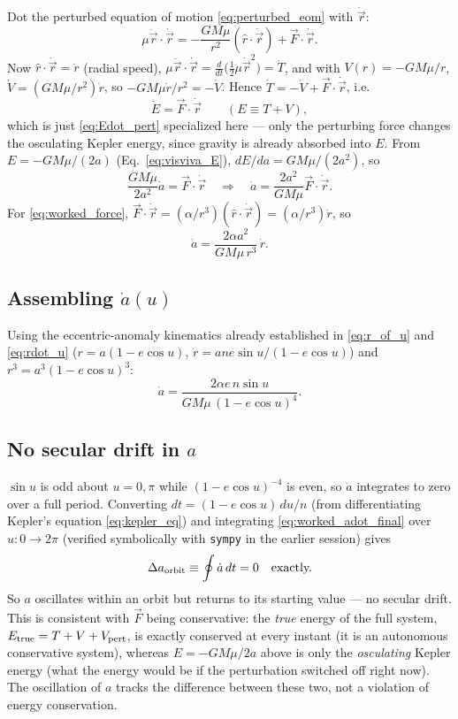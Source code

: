 \documentclass[11pt]{article}
\newcommand{\vecr}{\vec r}
\newcommand{\vecF}{\vec F}
\newcommand{\rhat}{\hat r}
\begin{document}
Dot the perturbed equation of motion \eqref{eq:perturbed_eom} with $\dot{\vecr}$:
\[
\mu\ddot{\vecr}\cdot\dot{\vecr} = -\frac{GM\mu}{r^2}(\rhat\cdot\dot{\vecr})+\vecF\cdot\dot{\vecr}.
\]
Now $\rhat\cdot\dot{\vecr}=\dot r$ (radial speed), $\mu\ddot{\vecr}\cdot\dot{\vecr}=\frac{d}{dt}\big(\tfrac12\mu\dot{\vecr}^2\big)=\dot T$, and with $V(r)=-GM\mu/r$, $\dot V = (GM\mu/r^2)\dot r$, so $-GM\mu\dot r/r^2=-\dot V$. Hence $\dot T=-\dot V+\vecF\cdot\dot{\vecr}$, i.e.
\begin{equation}
\dot E = \vecF\cdot\dot{\vecr} \qquad (E\equiv T+V), \label{eq:worked_Edot}
\end{equation}
which is just \eqref{eq:Edot_pert} specialized here — only the perturbing force changes the osculating Kepler energy, since gravity is already absorbed into $E$. From $E=-GM\mu/(2a)$ (Eq.~\ref{eq:visviva_E}), $dE/da=GM\mu/(2a^2)$, so
\[
\frac{GM\mu}{2a^2}\dot a = \vecF\cdot\dot{\vecr}
\quad\Longrightarrow\quad
\dot a = \frac{2a^2}{GM\mu}\vecF\cdot\dot{\vecr}.
\]
For \eqref{eq:worked_force}, $\vecF\cdot\dot{\vecr}=(\alpha/r^3)(\rhat\cdot\dot{\vecr})=(\alpha/r^3)\dot r$, so
\begin{equation}
\dot a = \frac{2\alpha a^2}{GM\mu\,r^3}\,\dot r. \label{eq:worked_adot1}
\end{equation}

\subsection{Assembling $\dot a(u)$}

Using the eccentric-anomaly kinematics already established in \eqref{eq:r_of_u} and \eqref{eq:rdot_u} ($r=a(1-e\cos u)$, $\dot r = ane\sin u/(1-e\cos u)$) and $r^3=a^3(1-e\cos u)^3$:
\begin{equation}
\dot a = \frac{2\alpha e\,n\sin u}{GM\mu\,(1-e\cos u)^4}. \label{eq:worked_adot_final}
\end{equation}

\subsection{No secular drift in $a$}

$\sin u$ is odd about $u=0,\pi$ while $(1-e\cos u)^{-4}$ is even, so $\dot a$ integrates to zero over a full period. Converting $dt=(1-e\cos u)\,du/n$ (from differentiating Kepler's equation \ref{eq:kepler_eq}) and integrating \eqref{eq:worked_adot_final} over $u:0\to2\pi$ (verified symbolically with \texttt{sympy} in the earlier session) gives
\begin{equation}
\Delta a_{\rm orbit} \equiv \oint \dot a\,dt = 0 \quad\text{exactly.} \label{eq:worked_Delta_a}
\end{equation}
So $a$ oscillates within an orbit but returns to its starting value — no secular drift. This is consistent with $\vecF$ being conservative: the \emph{true} energy of the full system, $E_{\rm true}=T+V+V_{\rm pert}$, is exactly conserved at every instant (it is an autonomous conservative system), whereas $E=-GM\mu/2a$ above is only the \emph{osculating} Kepler energy (what the energy would be if the perturbation switched off right now). The oscillation of $a$ tracks the difference between these two, not a violation of energy conservation.
\end{document}
